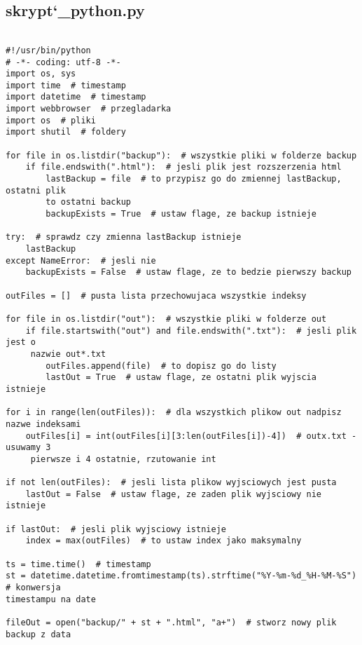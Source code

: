 \documentclass[12pt,a4paper]{article}
\begin{document}
	\subsection*{skrypt\char`_python.py}
	
	\begin{verbatim}
	
#!/usr/bin/python
# -*- coding: utf-8 -*-
import os, sys
import time  # timestamp
import datetime  # timestamp
import webbrowser  # przegladarka
import os  # pliki
import shutil  # foldery

for file in os.listdir("backup"):  # wszystkie pliki w folderze backup
    if file.endswith(".html"):  # jesli plik jest rozszerzenia html
        lastBackup = file  # to przypisz go do zmiennej lastBackup, ostatni plik 
        to ostatni backup
        backupExists = True  # ustaw flage, ze backup istnieje

try:  # sprawdz czy zmienna lastBackup istnieje
    lastBackup
except NameError:  # jesli nie
    backupExists = False  # ustaw flage, ze to bedzie pierwszy backup

outFiles = []  # pusta lista przechowujaca wszystkie indeksy

for file in os.listdir("out"):  # wszystkie pliki w folderze out
    if file.startswith("out") and file.endswith(".txt"):  # jesli plik jest o
     nazwie out*.txt
        outFiles.append(file)  # to dopisz go do listy
        lastOut = True  # ustaw flage, ze ostatni plik wyjscia istnieje

for i in range(len(outFiles)):  # dla wszystkich plikow out nadpisz nazwe indeksami
    outFiles[i] = int(outFiles[i][3:len(outFiles[i])-4])  # outx.txt - usuwamy 3
     pierwsze i 4 ostatnie, rzutowanie int

if not len(outFiles):  # jesli lista plikow wyjsciowych jest pusta
    lastOut = False  # ustaw flage, ze zaden plik wyjsciowy nie istnieje

if lastOut:  # jesli plik wyjsciowy istnieje
    index = max(outFiles)  # to ustaw index jako maksymalny

ts = time.time()  # timestamp
st = datetime.datetime.fromtimestamp(ts).strftime("%Y-%m-%d_%H-%M-%S")  # konwersja 
timestampu na date

fileOut = open("backup/" + st + ".html", "a+")  # stworz nowy plik backup z data


\end{verbatim}
\end{document}
